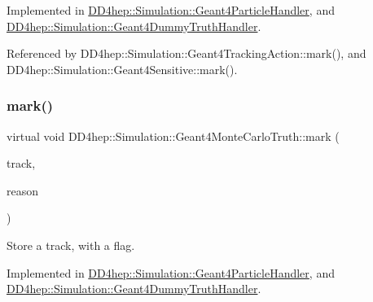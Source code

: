 Implemented in \hyperlink{class_d_d4hep_1_1_simulation_1_1_geant4_particle_handler_a50e23a41d610fd19644a8393da13305b}{D\+D4hep\+::\+Simulation\+::\+Geant4\+Particle\+Handler}, and \hyperlink{class_d_d4hep_1_1_simulation_1_1_geant4_dummy_truth_handler_ae7540d20113834f5a31134df344813ad}{D\+D4hep\+::\+Simulation\+::\+Geant4\+Dummy\+Truth\+Handler}.



Referenced by D\+D4hep\+::\+Simulation\+::\+Geant4\+Tracking\+Action\+::mark(), and D\+D4hep\+::\+Simulation\+::\+Geant4\+Sensitive\+::mark().

\hypertarget{class_d_d4hep_1_1_simulation_1_1_geant4_monte_carlo_truth_a6b63ab3d0ac424aba1088fb9ea2994dc}{}\label{class_d_d4hep_1_1_simulation_1_1_geant4_monte_carlo_truth_a6b63ab3d0ac424aba1088fb9ea2994dc} 
\subsubsection{\texorpdfstring{mark()}{mark()}\hspace{0.1cm}{\footnotesize\ttfamily [2/4]}}
{\footnotesize\ttfamily virtual void D\+D4hep\+::\+Simulation\+::\+Geant4\+Monte\+Carlo\+Truth\+::mark (\begin{DoxyParamCaption}\item[{const G4\+Track $\ast$}]{track,  }\item[{int}]{reason }\end{DoxyParamCaption})\hspace{0.3cm}{\ttfamily [pure virtual]}}



Store a track, with a flag. 



Implemented in \hyperlink{class_d_d4hep_1_1_simulation_1_1_geant4_particle_handler_a3ad0a4c70220326e76da4dd79c95501c}{D\+D4hep\+::\+Simulation\+::\+Geant4\+Particle\+Handler}, and \hyperlink{class_d_d4hep_1_1_simulation_1_1_geant4_dummy_truth_handler_aa5a1b21c7557cd4dfb314b217fc37a87}{D\+D4hep\+::\+Simulation\+::\+Geant4\+Dummy\+Truth\+Handler}.

\hypertarget{class_d_d4hep_1_1_simulation_1_1_geant4_monte_carlo_truth_a6aa3674a7c9e2f0132251bf05c7dab88}{}\label{class_d_d4hep_1_1_simulation_1_1_geant4_monte_carlo_truth_a6aa3674a7c9e2f0132251bf05c7dab88} 
